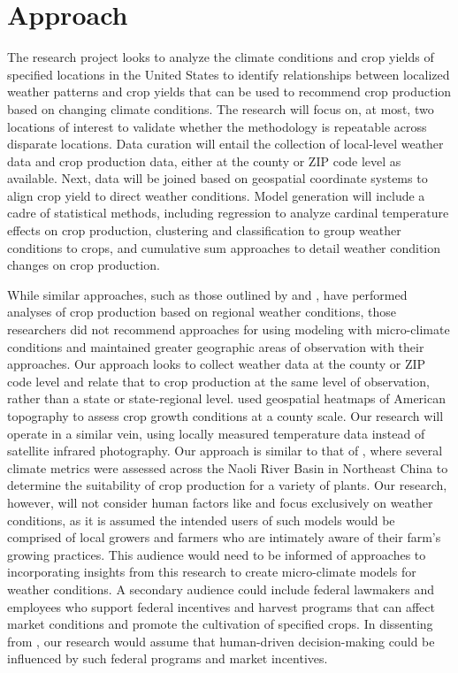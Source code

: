 \documentclass{article}
\begin{document}
\section{Approach}\label{sec:approach}
\hspace{.5cm}The research project looks to analyze the climate conditions and crop yields of specified locations in the United States to identify relationships between localized weather patterns and crop yields that can be used to recommend crop production based on changing climate conditions. The research will focus on, at most, two locations of interest to validate whether the methodology is repeatable across disparate locations. Data curation will entail the collection of local-level weather data and crop production data, either at the county or ZIP code level as available. Next, data will be joined based on geospatial coordinate systems to align crop yield to direct weather conditions. Model generation will include a cadre of statistical methods, including regression to analyze cardinal temperature effects on crop production, clustering and classification to group weather conditions to crops, and cumulative sum approaches to detail weather condition changes on crop production. 

While similar approaches, such as those outlined by \citet{UIUC} and \citet{ISWS}, have performed analyses of crop production based on regional weather conditions, those researchers did not recommend approaches for using modeling with micro-climate conditions and maintained greater geographic areas of observation with their approaches. Our approach looks to collect weather data at the county or ZIP code level and relate that to crop production at the same level of observation, rather than a state or state-regional level. \citet{RemoteSens} used geospatial heatmaps of American topography to assess crop growth conditions at a county scale. Our research will operate in a similar vein, using locally measured temperature data instead of satellite infrared photography. Our approach is similar to that of \citet{Sustainability}, where several climate metrics were assessed across the Naoli River Basin in Northeast China to determine the suitability of crop production for a variety of plants. Our research, however, will not consider human factors like \citet{Sustainability} and focus exclusively on weather conditions, as it is assumed the intended users of such models would be comprised of local growers and farmers who are intimately aware of their farm's growing practices. This audience would need to be informed of approaches to incorporating insights from this research to create micro-climate models for weather conditions. A secondary audience could include federal lawmakers and employees who support federal incentives and harvest programs that can affect market conditions and promote the cultivation of specified crops. In dissenting from \citet{Sustainability}, our research would assume that human-driven decision-making could be influenced by such federal programs and market incentives. 
\end{document}

